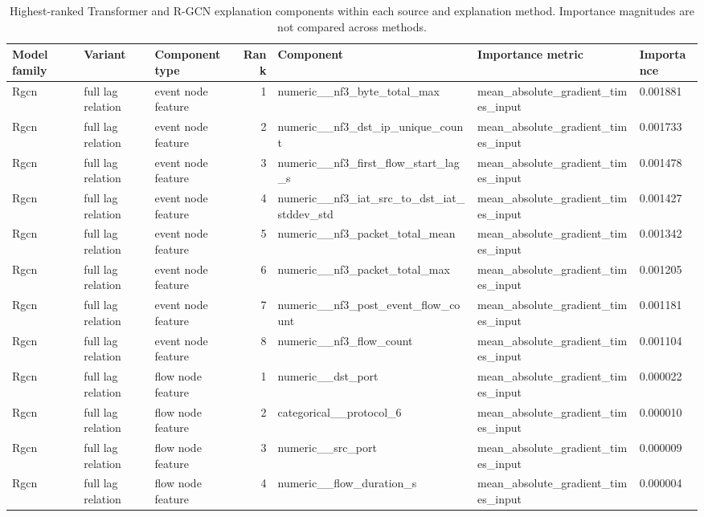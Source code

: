 \begin{table}
\caption{Highest-ranked Transformer and R-GCN explanation components within each source and explanation method. Importance magnitudes are not compared across methods.}
\label{tab:explainability-summary}
\begin{tabular}{lllrlll}
\toprule
Model family & Variant & Component type & Rank & Component & Importance metric & Importance \\
\midrule
Rgcn & full lag relation & event node feature & 1 & numeric\_\_nf3\_byte\_total\_max & mean\_absolute\_gradient\_times\_input & 0.001881 \\
Rgcn & full lag relation & event node feature & 2 & numeric\_\_nf3\_dst\_ip\_unique\_count & mean\_absolute\_gradient\_times\_input & 0.001733 \\
Rgcn & full lag relation & event node feature & 3 & numeric\_\_nf3\_first\_flow\_start\_lag\_s & mean\_absolute\_gradient\_times\_input & 0.001478 \\
Rgcn & full lag relation & event node feature & 4 & numeric\_\_nf3\_iat\_src\_to\_dst\_iat\_stddev\_std & mean\_absolute\_gradient\_times\_input & 0.001427 \\
Rgcn & full lag relation & event node feature & 5 & numeric\_\_nf3\_packet\_total\_mean & mean\_absolute\_gradient\_times\_input & 0.001342 \\
Rgcn & full lag relation & event node feature & 6 & numeric\_\_nf3\_packet\_total\_max & mean\_absolute\_gradient\_times\_input & 0.001205 \\
Rgcn & full lag relation & event node feature & 7 & numeric\_\_nf3\_post\_event\_flow\_count & mean\_absolute\_gradient\_times\_input & 0.001181 \\
Rgcn & full lag relation & event node feature & 8 & numeric\_\_nf3\_flow\_count & mean\_absolute\_gradient\_times\_input & 0.001104 \\
Rgcn & full lag relation & flow node feature & 1 & numeric\_\_dst\_port & mean\_absolute\_gradient\_times\_input & 0.000022 \\
Rgcn & full lag relation & flow node feature & 2 & categorical\_\_protocol\_6 & mean\_absolute\_gradient\_times\_input & 0.000010 \\
Rgcn & full lag relation & flow node feature & 3 & numeric\_\_src\_port & mean\_absolute\_gradient\_times\_input & 0.000009 \\
Rgcn & full lag relation & flow node feature & 4 & numeric\_\_flow\_duration\_s & mean\_absolute\_gradient\_times\_input & 0.000004 \\

\end{tabular}
\end{table}
